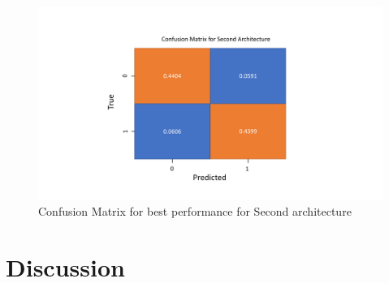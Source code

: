 \documentclass{article}
\begin{document}
\begin{figure}[H]
    \centering
    \includegraphics[width=\textwidth]{Confusion_matrix_second_arch'.pdf}
    \caption{Confusion Matrix for best performance for Second architecture}
    \label{fig:Conf2}
\end{figure}

\section{Discussion}
\end{document}
